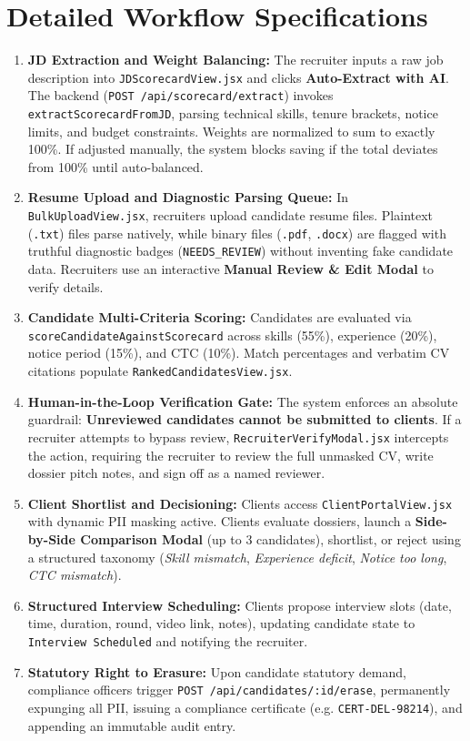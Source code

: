 \documentclass[11pt,a4paper,oneside]{report}
\begin{document}
\section{Detailed Workflow Specifications}
\begin{enumerate}[leftmargin=1.5em]
    \item \textbf{JD Extraction and Weight Balancing:} The recruiter inputs a raw job description into \texttt{JDScorecardView.jsx} and clicks \textbf{Auto-Extract with AI}. The backend (\texttt{POST /api/scorecard/extract}) invokes \texttt{extractScorecardFromJD}, parsing technical skills, tenure brackets, notice limits, and budget constraints. Weights are normalized to sum to exactly 100\%. If adjusted manually, the system blocks saving if the total deviates from 100\% until auto-balanced.
    \item \textbf{Resume Upload and Diagnostic Parsing Queue:} In \texttt{BulkUploadView.jsx}, recruiters upload candidate resume files. Plaintext (\texttt{.txt}) files parse natively, while binary files (\texttt{.pdf}, \texttt{.docx}) are flagged with truthful diagnostic badges (\texttt{NEEDS\_REVIEW}) without inventing fake candidate data. Recruiters use an interactive \textbf{Manual Review \& Edit Modal} to verify details.
    \item \textbf{Candidate Multi-Criteria Scoring:} Candidates are evaluated via \texttt{scoreCandidateAgainstScorecard} across skills (55\%), experience (20\%), notice period (15\%), and CTC (10\%). Match percentages and verbatim CV citations populate \texttt{RankedCandidatesView.jsx}.
    \item \textbf{Human-in-the-Loop Verification Gate:} The system enforces an absolute guardrail: \textbf{Unreviewed candidates cannot be submitted to clients}. If a recruiter attempts to bypass review, \texttt{RecruiterVerifyModal.jsx} intercepts the action, requiring the recruiter to review the full unmasked CV, write dossier pitch notes, and sign off as a named reviewer.
    \item \textbf{Client Shortlist and Decisioning:} Clients access \texttt{ClientPortalView.jsx} with dynamic PII masking active. Clients evaluate dossiers, launch a \textbf{Side-by-Side Comparison Modal} (up to 3 candidates), shortlist, or reject using a structured taxonomy (\textit{Skill mismatch}, \textit{Experience deficit}, \textit{Notice too long}, \textit{CTC mismatch}).
    \item \textbf{Structured Interview Scheduling:} Clients propose interview slots (date, time, duration, round, video link, notes), updating candidate state to \texttt{Interview Scheduled} and notifying the recruiter.
    \item \textbf{Statutory Right to Erasure:} Upon candidate statutory demand, compliance officers trigger \texttt{POST /api/candidates/:id/erase}, permanently expunging all PII, issuing a compliance certificate (e.g. \texttt{CERT-DEL-98214}), and appending an immutable audit entry.
\end{enumerate}
\end{document}
